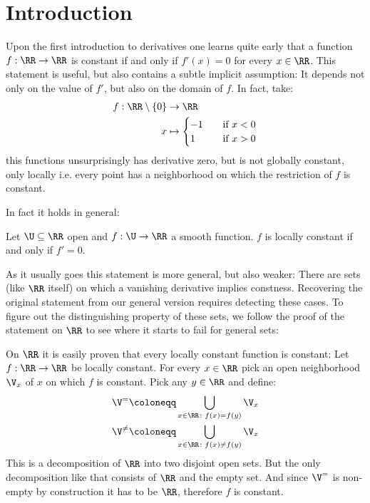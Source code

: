 \chapter*{Introduction}
Upon the first introduction to derivatives one learns quite early that a function
$f: \RR \to \RR$ is constant if and only if $f'(x) = 0$ for every $x \in \RR$. This statement is useful,
but also contains a subtle implicit assumption: It depends not only on the value of $f'$, but also on
the domain of $f$. In fact, take:
\begin{align*}
	f: \RR \setminus \{0\} &\to \RR \\
		x &\mapsto \begin{cases}
			-1 \quad&\text{if } x < 0 \\
			 1 \quad&\text{if } x > 0
		\end{cases}
\end{align*}
this functions unsurprisingly has derivative zero, but is not globally constant, only locally i.e. every
point has a neighborhood on which the restriction of $f$ is constant.

In fact it holds in general:
\begin{lemma}
	Let $\U \subseteq \RR$ open and $f: \U \to \RR$ a smooth function. $f$ is locally constant if and only if
	$f' = 0$.
\end{lemma}
As it usually goes this statement is more general, but also weaker: There are sets (like $\RR$ itself) on
which a vanishing derivative implies constness. Recovering the original statement from our general version
requires detecting these cases. To figure out the distinguishing property of these sets, we follow the proof of
the statement on $\RR$ to see where it starts to fail for general sets:

On $\RR$ it is easily proven that every locally constant function is constant: Let $f: \RR \to \RR$ be locally
constant. For every $x \in \RR$ pick an open neighborhood $\V_x$ of $x$ on which $f$ is constant. Pick any
$y \in \RR$ and define:
\begin{align*}
	\V^=      &\coloneqq \bigcup_{x \in \RR\colon f(x) = f(y)} \V_x \\
	\V^{\neq} &\coloneqq \bigcup_{x \in \RR\colon f(x) \neq f(y)} \V_x
\end{align*}
This is a decomposition of $\RR$ into two disjoint open sets. But the only decomposition like that consists
of $\RR$ and the empty set. And since $\V^=$ is non-empty by construction it has to be $\RR$, therefore $f$ is
constant.

